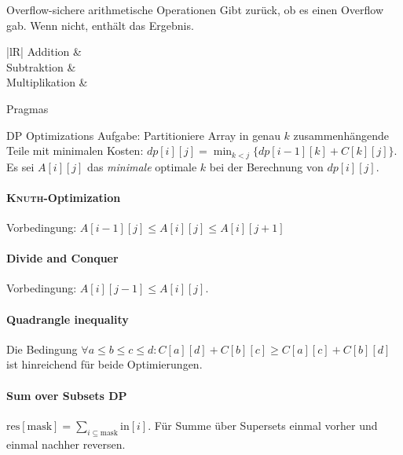 \begin{algorithm}{Overflow-sichere arithmetische Operationen}
	Gibt zurück, ob es einen Overflow gab. Wenn nicht, enthält  das Ergebnis.
	\begin{expandtable}
		\begin{tabularx}{\linewidth}{|lR|}
			\hline
			Addition &  \\
			Subtraktion &  \\
			Multiplikation &  \\
			\hline
		\end{tabularx}
	\end{expandtable}
\end{algorithm}

\begin{algorithm}{Pragmas}
\end{algorithm}

\begin{algorithm}{DP Optimizations}
	Aufgabe: Partitioniere Array in genau $k$ zusammenhängende Teile mit minimalen Kosten:
	$dp[i][j] = \min_{k<j}\{dp[i-1][k]+C[k][j]\}$. Es sei $A[i][j]$ das \emph{minimale} optimale
	$k$ bei der Berechnung von $dp[i][j]$.
	
	\paragraph{\textsc{Knuth}-Optimization} Vorbedingung: $A[i - 1][j] \leq A[i][j] \leq A[i][j + 1]$
	
	
	\paragraph{Divide and Conquer}
	Vorbedingung: $A[i][j - 1] \leq A[i][j]$.
	
	
	\paragraph{Quadrangle inequality} Die Bedingung  $\forall a\leq b\leq c\leq d:
	C[a][d] + C[b][c] \geq C[a][c] + C[b][d]$ ist hinreichend für beide Optimierungen.
	
	\paragraph{Sum over Subsets DP} $\text{res}[\text{mask}]=\sum_{i\subseteq\text{mask}}\text{in}[i]$.
	Für Summe über Supersets  einmal vorher und einmal nachher reversen.
\end{algorithm}


